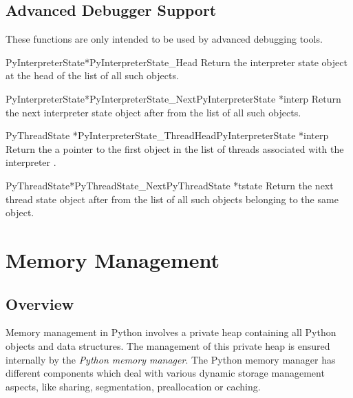 \documentclass{manual}
\begin{document}
\section{Advanced Debugger Support \label{advanced-debugging}}

These functions are only intended to be used by advanced debugging
tools.

\begin{cfuncdesc}{PyInterpreterState*}{PyInterpreterState_Head}{}
Return the interpreter state object at the head of the list of all
such objects.
\end{cfuncdesc}

\begin{cfuncdesc}{PyInterpreterState*}{PyInterpreterState_Next}{PyInterpreterState *interp}
Return the next interpreter state object after  from the
list of all such objects.
\end{cfuncdesc}

\begin{cfuncdesc}{PyThreadState *}{PyInterpreterState_ThreadHead}{PyInterpreterState *interp}
Return the a pointer to the first  object in the
list of threads associated with the interpreter .
\end{cfuncdesc}

\begin{cfuncdesc}{PyThreadState*}{PyThreadState_Next}{PyThreadState *tstate}
Return the next thread state object after  from the list
of all such objects belonging to the same 
object.
\end{cfuncdesc}


\chapter{Memory Management \label{memory}}


\section{Overview \label{memoryOverview}}

Memory management in Python involves a private heap containing all
Python objects and data structures. The management of this private
heap is ensured internally by the \emph{Python memory manager}.  The
Python memory manager has different components which deal with various
dynamic storage management aspects, like sharing, segmentation,
preallocation or caching.
\end{document}
